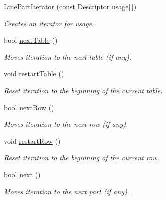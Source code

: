 \begin{DoxyCompactItemize}
\item 
\hyperlink{class_option_parser_1_1_print_usage_implementation_1_1_line_part_iterator_a7696a3ac62951caddc7853824cf31dac}{Line\-Part\-Iterator} (const \hyperlink{struct_option_parser_1_1_descriptor}{Descriptor} \hyperlink{_community_detection_8cpp_ae4e685e845abde182eb8fc1f87b756ae}{usage}\mbox{[}$\,$\mbox{]})
\begin{DoxyCompactList}\small\item\em Creates an iterator for {\ttfamily usage}. \end{DoxyCompactList}\item 
bool \hyperlink{class_option_parser_1_1_print_usage_implementation_1_1_line_part_iterator_a4f3a60ab882ab40ae961e3ed49d706ae}{next\-Table} ()
\begin{DoxyCompactList}\small\item\em Moves iteration to the next table (if any). \end{DoxyCompactList}\item 
void \hyperlink{class_option_parser_1_1_print_usage_implementation_1_1_line_part_iterator_a95508d086451c74a50d682ccc2e59450}{restart\-Table} ()
\begin{DoxyCompactList}\small\item\em Reset iteration to the beginning of the current table. \end{DoxyCompactList}\item 
bool \hyperlink{class_option_parser_1_1_print_usage_implementation_1_1_line_part_iterator_a329e6f5eca1a9376d63e1d6b99ecba29}{next\-Row} ()
\begin{DoxyCompactList}\small\item\em Moves iteration to the next row (if any). \end{DoxyCompactList}\item 
void \hyperlink{class_option_parser_1_1_print_usage_implementation_1_1_line_part_iterator_a4b7768a70db20da54569bd0b81be4294}{restart\-Row} ()
\begin{DoxyCompactList}\small\item\em Reset iteration to the beginning of the current row. \end{DoxyCompactList}\item 
bool \hyperlink{class_option_parser_1_1_print_usage_implementation_1_1_line_part_iterator_aa73c9df321f1101b9a0496af8eb7f9ae}{next} ()
\begin{DoxyCompactList}\small\item\em Moves iteration to the next part (if any). \end{DoxyCompactList}\item 

\end{DoxyCompactItemize}

